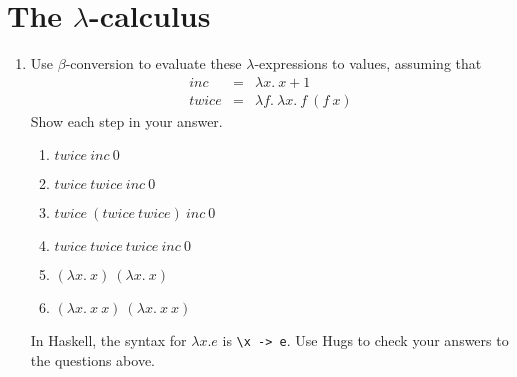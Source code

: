 \documentclass{article}
\begin{document}
\section{The $\lambda$-calculus}
\begin{enumerate}
\item Use $\beta$-conversion to evaluate these $\lambda$-expressions
  to values, assuming that 
\begin{eqnarray*}
\mathit{inc}&=&\lambda x.~x+1\\
\mathit{twice}&=&\lambda f.~\lambda x.~f~(f~x)
\end{eqnarray*}
Show each step in your answer.
\begin{enumerate}
\item $\mathit{twice}~\mathit{inc}~0$ 
\item $\mathit{twice}~\mathit{twice}~\mathit{inc}~0$ 
\item $\mathit{twice}~(\mathit{twice}~\mathit{twice})~\mathit{inc}~0$ 
\item $\mathit{twice}~\mathit{twice}~\mathit{twice}~\mathit{inc}~0$ 
\item $(\lambda x.~x)~(\lambda x.~x)$ 
\item $(\lambda x.~x~x)~(\lambda x.~x~x)$ 
\end{enumerate}
In Haskell, the syntax for $\lambda x.e$ is \verb!\x -> e!. Use Hugs
to check your answers to the questions above.


\end{enumerate}
\end{document}
